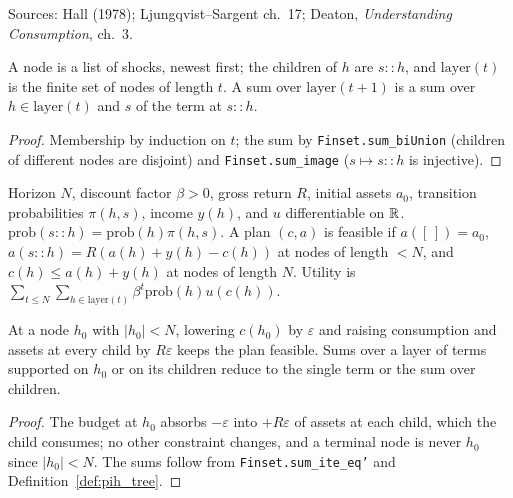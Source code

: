 Sources: Hall (1978); Ljungqvist--Sargent ch.~17; Deaton, \emph{Understanding Consumption}, ch.~3.

\begin{definition}
\label{def:pih_tree}
\leanok
A node is a list of shocks, newest first; the children of $h$ are $s :: h$, and $\mathrm{layer}(t)$ is the finite set
of nodes of length $t$. A sum over $\mathrm{layer}(t+1)$ is a sum over $h \in \mathrm{layer}(t)$ and $s$ of the term
at $s :: h$.
\end{definition}
\begin{proof}
\leanok
Membership by induction on $t$; the sum by \texttt{Finset.sum\_biUnion} (children of different nodes are disjoint)
and \texttt{Finset.sum\_image} ($s \mapsto s :: h$ is injective).
\end{proof}

\begin{definition}
\label{def:pih_problem}
\leanok
{}
Horizon $N$, discount factor $\beta > 0$, gross return $R$, initial assets $a_0$, transition probabilities
$\pi(h, s)$, income $y(h)$, and $u$ differentiable on $\mathbb{R}$. $\mathrm{prob}(s :: h) = \mathrm{prob}(h)\pi(h,s)$. A plan
$(c, a)$ is feasible if $a([\,]) = a_0$, $a(s :: h) = R(a(h) + y(h) - c(h))$ at nodes of length $< N$, and
$c(h) \le a(h) + y(h)$ at nodes of length $N$. Utility is $\sum_{t \le N}\sum_{h \in \mathrm{layer}(t)}
\beta^t\mathrm{prob}(h)u(c(h))$.
\end{definition}

\begin{lemma}
\label{lem:pih_perturb}
\leanok
{}
At a node $h_0$ with $|h_0| < N$, lowering $c(h_0)$ by $\varepsilon$ and raising consumption and assets at every
child by $R\varepsilon$ keeps the plan feasible. Sums over a layer of terms supported on $h_0$ or on its children
reduce to the single term or the sum over children.
\end{lemma}
\begin{proof}
\leanok
The budget at $h_0$ absorbs $-\varepsilon$ into $+R\varepsilon$ of assets at each child, which the child consumes;
no other constraint changes, and a terminal node is never $h_0$ since $|h_0| < N$. The sums follow from
\texttt{Finset.sum\_ite\_eq'} and Definition~\ref{def:pih_tree}.
\end{proof}

